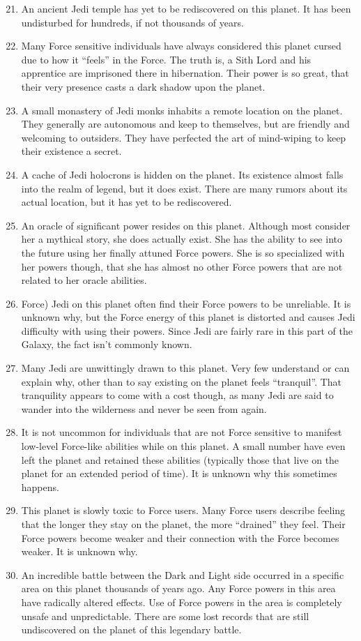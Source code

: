 \documentclass{article}
\begin{document}
\begin{enumerate}
	\setcounter{enumi}{20}
	\item An ancient Jedi temple has yet to be rediscovered on this planet. It has been undisturbed for hundreds, if not thousands of years.
	\item Many Force sensitive individuals have always considered this planet cursed due to how it “feels” in the Force. The truth is, a Sith Lord and his apprentice are imprisoned there in hibernation. Their power is so great, that their very presence casts a dark shadow upon the planet.
	\item A small monastery of Jedi monks inhabits a remote location on the planet. They generally are autonomous and keep to themselves, but are friendly and welcoming to outsiders. They have perfected the art of mind-wiping to keep their existence a secret.
	\item A cache of Jedi holocrons is hidden on the planet. Its existence almost falls into the realm of legend, but it does exist. There are many rumors about its actual location, but it has yet to be rediscovered.
	\item An oracle of significant power resides on this planet. Although most consider her a mythical story, she does actually exist. She has the ability to see into the future using her finally attuned Force powers. She is so specialized with her powers though, that she has almost no other Force powers that are not related to her oracle abilities.
	\item Force) Jedi on this planet often find their Force powers to be unreliable. It is unknown why, but the Force energy of this planet is distorted and causes Jedi difficulty with using their powers. Since Jedi are fairly rare in this part of the Galaxy, the fact isn’t commonly known.
	\item Many Jedi are unwittingly drawn to this planet. Very few understand or can explain why, other than to say existing on the planet feels “tranquil”. That tranquility appears to come with a cost though, as many Jedi are said to wander into the wilderness and never be seen from again.
	\item It is not uncommon for individuals that are not Force sensitive to manifest low-level Force-like abilities while on this planet. A small number have even left the planet and retained these abilities (typically those that live on the planet for an extended period of time). It is unknown why this sometimes happens.
	\item This planet is slowly toxic to Force users. Many Force users describe feeling that the longer they stay on the planet, the more “drained” they feel. Their Force powers become weaker and their connection with the Force becomes weaker. It is unknown why.
	\item An incredible battle between the Dark and Light side occurred in a specific area on this planet thousands of years ago. Any Force powers in this area have radically altered effects. Use of Force powers in the area is completely unsafe and unpredictable. There are some lost records that are still undiscovered on the planet of this legendary battle.
\end{enumerate}
\end{document}
